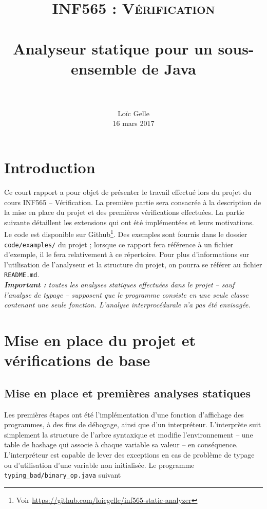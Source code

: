 \documentclass[paper=a4, fontsize=11pt]{scrartcl}
\title{	
		\usefont{OT1}{bch}{b}{n}
		\normalfont \normalsize \textsc{INF565 : Vérification} \\ [25pt]
		\horrule{0.5pt} \\[0.4cm]
		\huge Analyseur statique pour un sous-ensemble de Java \\
		\horrule{2pt} \\[0.5cm]
}
\author{
		\normalfont 								\normalsize
        Lo\"{i}c Gelle\\[-3pt]		\normalsize
        16 mars 2017
}
\date{}
\numberwithin{figure}{section}			%
\numberwithin{table}{section}				%
\begin{document}
\maketitle
\section{Introduction}

Ce court rapport a pour objet de présenter le travail effectué lors du projet du cours INF565 -- Vérification. La première partie sera consacrée à la description de la mise en place du projet et des premières vérifications effectuées. La partie suivante détaillent les extensions qui ont été implémentées et leurs motivations.\\

Le code est disponible sur Github\footnote{Voir \url{https://github.com/loicgelle/inf565-static-analyzer}}. Des exemples sont fournis dans le dossier \texttt{code/examples/} du projet ; lorsque ce rapport fera référence à un fichier d'exemple, il le fera relativement à ce répertoire. Pour plus d'informations sur l'utilisation de l'analyseur et la structure du projet, on pourra se référer au fichier \texttt{README.md}.\\

\textit{\textbf{Important :} toutes les analyses statiques effectuées dans le projet -- sauf l'analyse de typage -- supposent que le programme consiste en une seule classe contenant une seule fonction. L'analyse interprocédurale n'a pas été envisagée.}

\section{Mise en place du projet et vérifications de base}

\subsection{Mise en place et premières analyses statiques}

Les premières étapes ont été l'implémentation d'une fonction d'affichage des programmes, à des fins de débogage, ainsi que d'un interpréteur. L'interprète suit simplement la structure de l'arbre syntaxique et modifie l'environnement -- une table de hashage qui associe à chaque variable sa valeur -- en conséquence.\\

L'interpréteur est capable de lever des exceptions en cas de problème de typage ou d'utilisation d'une variable non initialisée. Le programme \texttt{typing\_bad/binary\_op.java} suivant
\end{document}
